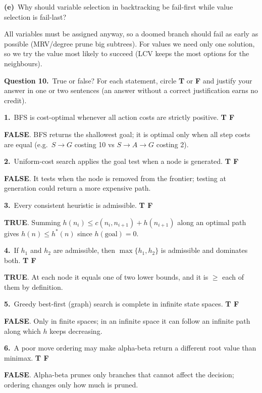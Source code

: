 \documentclass[11pt,a4paper]{article}
\newcommand{\question}[1]{\par\medskip\noindent\textbf{Question #1.}\ }
\newcommand{\subq}[1]{\par\smallskip\noindent\textbf{#1}\ }
\newcommand{\T}{\textbf{\textcolor{green!45!black}{TRUE}}}
\newcommand{\F}{\textbf{\textcolor{red!70!black}{FALSE}}}
\begin{document}
\subq{(e)}Why should variable selection in backtracking be fail-first while value selection is fail-last?
\begin{solbox}
All variables must be assigned anyway, so a doomed branch should fail as early as possible (MRV/degree prune big subtrees). For values we need only one solution, so we try the value most likely to succeed (LCV keeps the most options for the neighbours).
\end{solbox}
\question{10}True or false?
For each statement, circle \textbf{T} or \textbf{F} and justify your answer in one or two sentences (an answer without a correct justification earns no credit).
\subq{1.}BFS is cost-optimal whenever all action costs are strictly positive. \hfill \textbf{T \quad F}
\begin{solbox}
\F. BFS returns the shallowest goal; it is optimal only when all step costs are equal (e.g.\ $S\to G$ costing 10 vs $S\to A\to G$ costing 2).
\end{solbox}
\subq{2.}Uniform-cost search applies the goal test when a node is generated. \hfill \textbf{T \quad F}
\begin{solbox}
\F. It tests when the node is removed from the frontier; testing at generation could return a more expensive path.
\end{solbox}
\subq{3.}Every consistent heuristic is admissible. \hfill \textbf{T \quad F}
\begin{solbox}
\T. Summing $h(n_i)\le c(n_i,n_{i+1})+h(n_{i+1})$ along an optimal path gives $h(n)\le h^*(n)$ since $h(\text{goal})=0$.
\end{solbox}
\subq{4.}If $h_1$ and $h_2$ are admissible, then $\max\{h_1,h_2\}$ is admissible and dominates both. \hfill \textbf{T \quad F}
\begin{solbox}
\T. At each node it equals one of two lower bounds, and it is $\ge$ each of them by definition.
\end{solbox}
\subq{5.}Greedy best-first (graph) search is complete in infinite state spaces. \hfill \textbf{T \quad F}
\begin{solbox}
\F. Only in finite spaces; in an infinite space it can follow an infinite path along which $h$ keeps decreasing.
\end{solbox}
\subq{6.}A poor move ordering may make alpha-beta return a different root value than minimax. \hfill \textbf{T \quad F}
\begin{solbox}
\F. Alpha-beta prunes only branches that cannot affect the decision; ordering changes only how much is pruned.
\end{solbox}
\end{document}
